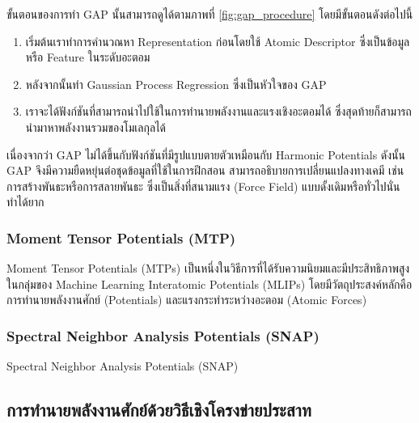 ขั้นตอนของการทำ GAP นั้นสามารถดูได้ตามภาพที่ \ref{fig:gap_procedure} โดยมีขั้นตอนดังต่อไปนี้
%
\begin{enumerate}[topsep=0pt,noitemsep]\setlength\itemsep{0.5em}
    \item เริ่มต้นเราทำการคำนวณหา Representation ก่อนโดยใช้ Atomic Descriptor ซึ่งเป็นข้อมูลหรือ Feature ในระดับอะตอม
    
    \item หลังจากนั้นทำ Gaussian Process Regression ซึ่งเป็นหัวใจของ GAP
    
    \item เราจะได้ฟังก์ชันที่สามารถนำไปใช้ในการทำนายพลังงานและแรงเชิงอะตอมได้ ซึ่งสุดท้ายก็สามารถนำมาหาพลังงานรวมของโมเลกุลได้
\end{enumerate}

เนื่องจากว่า GAP ไม่ได้ขึ้นกับฟังก์ชันที่มีรูปแบบตายตัวเหมือนกับ Harmonic Potentials ดังนั้น GAP จึงมีความยืดหยุ่นต่อชุดข้อมูลที่ใช้ในการฝึกสอน สามารถอธิบายการเปลี่ยนแปลงทางเคมี เช่น การสร้างพันธะหรือการสลายพันธะ ซึ่งเป็นสิ่งที่สนามแรง (Force Field) แบบดั้งเดิมหรือทั่วไปนั่นทำได้ยาก\autocite{ceriotti2018}

\subsubsection{Moment Tensor Potentials (MTP)} 

Moment Tensor Potentials (MTPs) เป็นหนึ่งในวิธีการที่ได้รับความนิยมและมีประสิทธิภาพสูงในกลุ่มของ Machine Learning Interatomic Potentials (MLIPs) โดยมีวัตถุประสงค์หลักคือการทำนายพลังงานศักย์ (Potentials) และแรงกระทำระหว่างอะตอม (Atomic Forces)\autocite{shapeev2016}

\subsubsection{Spectral Neighbor Analysis Potentials (SNAP)} 

Spectral Neighbor Analysis Potentials (SNAP)\autocite{thompson2015,deng2019,cusentino2020,domina2022}

\subsection{การทำนายพลังงานศักย์ด้วยวิธีเชิงโครงข่ายประสาท}
\label{ssec:pred_pot_ener_nn}


